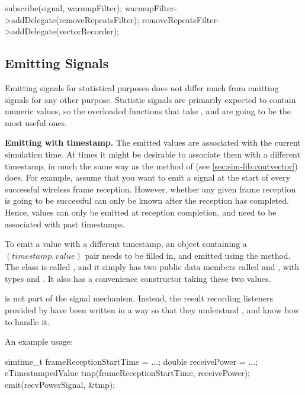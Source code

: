 \begin{ned}
\begin{cpp}
subscribe(signal, warmupFilter);
warmupFilter->addDelegate(removeRepeatsFilter);
removeRepeatsFilter->addDelegate(vectorRecorder);
\end{cpp}


\subsection{Emitting Signals}
\label{sec:simple-modules:emitting-statistic-signals}

Emitting signals for statistical purposes does not differ much from
emitting signals for any other purpose. Statistic signals are primarily
expected to contain numeric values, so the overloaded  functions
that take ,  and  are going to be the
most useful ones.

\textbf{Emitting with timestamp.} The emitted values are associated with
the current simulation time. At times it might be desirable to associate
them with a different timestamp, in much the same way as the
 method of  (see
\ref{sec:sim-lib:coutvector}) does. For example, assume that you want to
emit a signal at the start of every successful wireless frame reception.
However, whether any given frame reception is going to be successful can
only be known after the reception has completed. Hence, values can only be
emitted at reception completion, and need to be associated with past
timestamps.

To emit a value with a different timestamp, an object containing
a $(timestamp, value)$ pair needs to be filled in, and emitted using
the  method. The class is called
, and it simply has two public data members called
 and , with types  and .
It also has a convenience constructor taking these two values.

\begin{note}
 is not part of the signal mechanism. Instead,
the result recording listeners provided by {\opp} have been written
in a way so that they understand , and know how
to handle it.
\end{note}

An example usage:

\begin{cpp}
simtime_t frameReceptionStartTime = ...;
double receivePower = ...;
cTimestampedValue tmp(frameReceptionStartTime, receivePower);
emit(recvPowerSignal, &tmp);
\end{cpp}


\end{ned}
